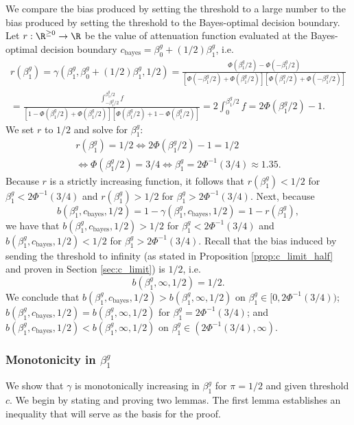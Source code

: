 \documentclass[12pt]{article}
\begin{document}
We compare the bias produced by setting the threshold to a large number to the bias produced by setting the threshold to the Bayes-optimal decision boundary. Let $r: \R^{\geq 0} \to \R$ be the value of attenuation function evaluated at the Bayes-optimal decision boundary $c_\textrm{bayes} = \beta^g_0 + (1/2) \beta^g_1$, i.e.
\begin{multline*}
r(\beta^g_1) = \gamma(\beta^g_1, \beta^g_0 + (1/2)\beta^g_1, 1/2) = \frac{\Phi(\beta^g_1/2) - \Phi(-\beta^g_1/2)}{\left[\Phi(-\beta^g_1/2) + \Phi( \beta^g_1/2) \right] \left[\Phi(\beta^g_1/2) + \Phi( -\beta^g_1/2)\right]} \\ = \frac{\int_{-\beta^g_1/2}^{\beta^g_1/2} f}{\left[ 1 - \Phi(\beta^g_1/2) + \Phi(\beta^g_1/2) \right]\left[ \Phi(\beta^g_1/2) + 1 - \Phi(\beta^g_1/2) \right]} = 2 \int_{0}^{\beta^g_1/2} f = 2 \Phi(\beta^g_1/2) - 1.
\end{multline*}
We set $r$ to $1/2$ and solve for $\beta^g_1$:
\begin{multline*}
r(\beta^g_1) = 1/2 \iff 2\Phi(\beta^g_1/2) -1 = 1/2 \\ \iff \Phi(\beta^g_1/2) = 3/4 \iff \beta^g_1 = 2 \Phi^{-1}(3/4) \approx 1.35.
\end{multline*}
Because $r$ is a strictly increasing function, it follows that $r(\beta^g_1) < 1/2$ for $\beta^g_1 < 2\Phi^{-1}(3/4)$ and $r(\beta^g_1) > 1/2$ for $\beta^g_1 > 2\Phi^{-1}(3/4).$ Next, because $$b(\beta^g_1, c_\textrm{bayes}, 1/2) = 1 - \gamma(\beta^g_1, c_\textrm{bayes}, 1/2) = 1 - r(\beta^g_1),$$ we have that $b(\beta^g_1, c_\textrm{bayes}, 1/2) > 1/2$ for $\beta^g_1 < 2 \Phi^{-1}(3/4)$ and $b(\beta^g_1, c_\textrm{bayes}, 1/2) < 1/2$ for $\beta^g_1 > 2 \Phi^{-1}(3/4)$. Recall that the bias induced by sending the threshold to infinity (as stated in Proposition \ref{prop:c_limit_half} and proven in Section \ref{sec:c_limit}) is $1/2$, i.e. $$b(\beta^g_1, \infty, 1/2) = 1/2.$$ We conclude that $b(\beta^g_1, c_\textrm{bayes},1/2) > b(\beta^g_1, \infty, 1/2)$ on $\beta^g_1 \in [0, 2\Phi^{-1}(3/4))$; $b(\beta^g_1, c_\textrm{bayes},1/2) = b(\beta^g_1, \infty, 1/2)$ for $\beta^g_1 = 2\Phi^{-1}(3/4)$; and $b(\beta^g_1, c_\textrm{bayes},1/2) < b(\beta^g_1, \infty, 1/2)$ on $\beta^g_1 \in (2\Phi^{-1}(3/4), \infty)$.

\subsubsection{Monotonicity in $\beta^g_1$}\label{sec:monotone}
We show that $\gamma$ is monotonically increasing in $\beta^g_1$ for $\pi = 1/2$ and given threshold $c$. We begin by stating and proving two lemmas. The first lemma establishes an inequality that will serve as the basis for the proof.
\end{document}
